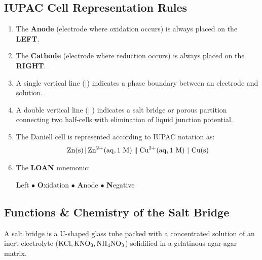 \subsection{IUPAC Cell Representation Rules}
\begin{enumerate}[leftmargin=*]
    \item The \textbf{Anode} (electrode where oxidation occurs) is always placed on the \textbf{LEFT}.
    \item The \textbf{Cathode} (electrode where reduction occurs) is always placed on the \textbf{RIGHT}.
    \item A single vertical line ($|$) indicates a phase boundary between an electrode and solution.
    \item A double vertical line ($||$) indicates a salt bridge or porous partition connecting two half-cells with elimination of liquid junction potential.
    \item The Daniell cell is represented according to IUPAC notation as:
    \begin{equation}
        \ce{Zn(s) | Zn^2+(aq, } 1\text{ M)} \parallel \ce{Cu^2+(aq, } 1\text{ M) | Cu(s)}
    \end{equation}
    \item The \textbf{LOAN} mnemonic:
    \begin{center}
    \textbf{L}eft \quad $\bullet$ \quad \textbf{O}xidation \quad $\bullet$ \quad \textbf{A}node \quad $\bullet$ \quad \textbf{N}egative
    \end{center}
\end{enumerate}

\subsection{Functions \& Chemistry of the Salt Bridge}
A salt bridge is a U-shaped glass tube packed with a concentrated solution of an inert electrolyte ($\ce{KCl}, \ce{KNO3}, \ce{NH4NO3}$) solidified in a gelatinous agar-agar matrix.


